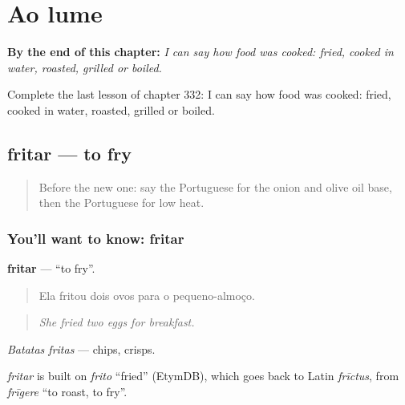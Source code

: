 
\chapter{Ao lume}
\label{ch:pt-ao-lume}

\begin{chapteropening}
\textbf{By the end of this chapter:} \emph{I can say how food was cooked: fried, cooked in water, roasted, grilled or boiled.}

Complete the last lesson of chapter 332: I can say how food was cooked: fried, cooked in water, roasted, grilled or boiled.
\end{chapteropening}

\section[fritar]{fritar — to fry}

\label{lesson:PT-C332-fritar}



\begin{quote}
Before the new one: say the Portuguese for the onion and olive oil base, then the Portuguese for low heat.
\end{quote}

\subsection*{You'll want to know: fritar}
\textbf{fritar} — \textquotedblleft{}to fry\textquotedblright{}.

\begin{quote}
Ela fritou dois ovos para o pequeno-almoço.
\end{quote}

\begin{quote}
\emph{She fried two eggs for breakfast.}
\end{quote}

\emph{Batatas fritas} — chips, crisps.

\begin{cousinweb}
\emph{fritar} is built on \emph{frito} \textquotedblleft{}fried\textquotedblright{} (EtymDB), which goes back to Latin \emph{frīctus}, from \emph{frīgere} \textquotedblleft{}to roast, to fry\textquotedblright{}.
\end{cousinweb}

